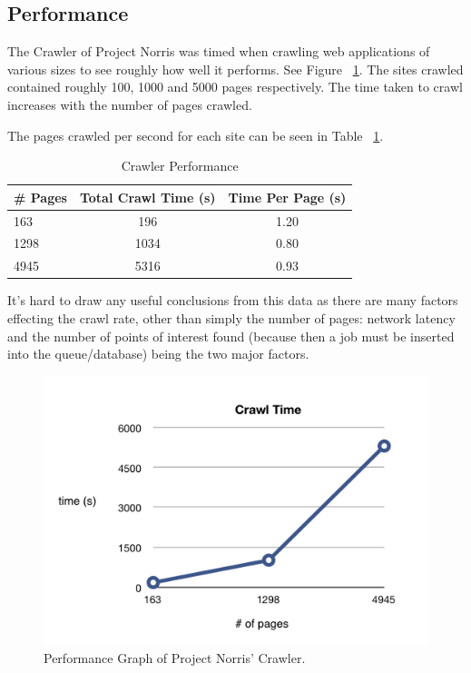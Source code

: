 \documentclass[12pt,a4paper]{article}
\begin{document}
\subsection{Performance}
The Crawler of Project Norris was timed when crawling web applications of various sizes to see roughly how well it performs.  See Figure ~\ref{fig:performance}.  The sites crawled contained roughly 100, 1000 and 5000 pages respectively.  The time taken to crawl increases with the number of pages crawled.

The pages crawled per second for each site can be seen in Table ~\ref{table:performance}.

\begin{center}
    \begin{table}
        \caption{Crawler Performance}
        \begin{center}
            \begin{tabular}{ | l | c | c | }
                \hline
                \# Pages & Total Crawl Time (s) & Time Per Page (s) \\ \hline
                163 & 196 & 1.20 \\ \hline
                1298 & 1034 & 0.80 \\ \hline
                4945 & 5316 & 0.93 \\ 
                \hline
            \end{tabular}
        \end{center}
        \label{table:performance}
    \end{table}
\end{center}

It's hard to draw any useful conclusions from this data as there are many factors effecting the crawl rate, other than simply the number of pages: network latency and the number of points of interest found (because then a job must be inserted into the queue/database) being the two major factors.

\begin{figure}[!ht]
    \begin{center}
        \includegraphics[scale=0.7]{images/crawl_performance.png}    
    \end{center}
    \caption{Performance Graph of Project Norris' Crawler.}
    \label{fig:performance}
\end{figure}
\end{document}
